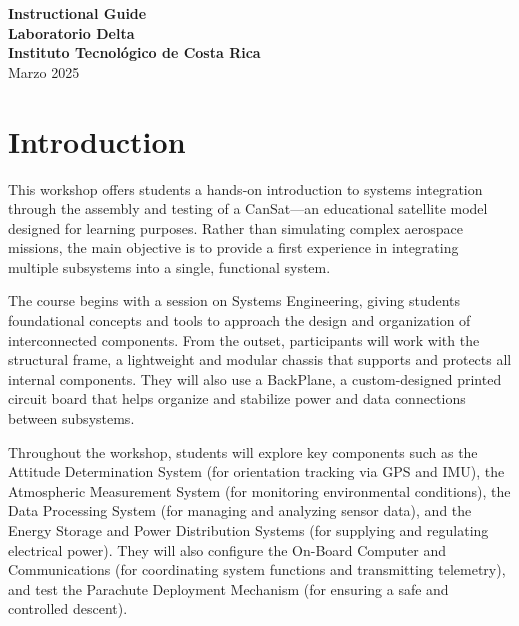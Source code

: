 \documentclass[a4paper,12pt]{article}
\begin{document}
\setlength{\parskip}{3mm}

\begin{titlepage}
    \centering
    {\Huge \textbf{Instructional Guide}}\\[1.5cm] %
    
    \textbf{\Large Laboratorio Delta }\\[0.5cm]  %
    
    \textbf{\large Instituto Tecnológico de Costa Rica}\\[0.5cm] %
    
    
    {\Large Marzo 2025}\\[2cm]  %

    
\end{titlepage}

\newpage

\section{Introduction} 

This workshop offers students a hands-on introduction to systems integration through the assembly and testing of a CanSat—an educational satellite model designed for learning purposes. Rather than simulating complex aerospace missions, the main objective is to provide a first experience in integrating multiple subsystems into a single, functional system.

The course begins with a session on Systems Engineering, giving students foundational concepts and tools to approach the design and organization of interconnected components. From the outset, participants will work with the structural frame, a lightweight and modular chassis that supports and protects all internal components. They will also use a BackPlane, a custom-designed printed circuit board that helps organize and stabilize power and data connections between subsystems.

Throughout the workshop, students will explore key components such as the Attitude Determination System (for orientation tracking via GPS and IMU), the Atmospheric Measurement System (for monitoring environmental conditions), the Data Processing System (for managing and analyzing sensor data), and the Energy Storage and Power Distribution Systems (for supplying and regulating electrical power). They will also configure the On-Board Computer and Communications (for coordinating system functions and transmitting telemetry), and test the Parachute Deployment Mechanism (for ensuring a safe and controlled descent).
\end{document}
